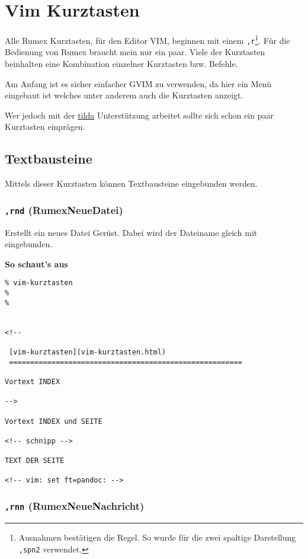 \chapter{Vim Kurztasten}
Alle Rumex Kurztasten, für den Editor VIM, beginnen mit einem
\texttt{,r}\footnote{Ausnahmen bestätigen die Regel. So wurde für die
  zwei spaltige Darstellung\\\texttt{,spn2} verwendet.}. Für die
Bedienung von Rumex braucht mein nur ein paar. Viele der Kurztasten
beinhalten eine Kombination einzelner Kurztasten bzw. Befehle.

Am Anfang ist es sicher einfacher GVIM zu verwenden, da hier ein Menü
eingebaut ist welches unter anderem auch die Kurztasten anzeigt.

Wer jedoch mit der
\href{beschreibung.html\#homepage-änderung-schnell-und-immer-aktuell}{tilda}
Unterstützung arbeitet sollte sich schon ein paar Kurztasten einprägen.

\section{Textbausteine}\label{textbausteine}

Mittels dieser Kurztasten können Textbausteine eingebunden werden.

\subsection{\texttt{,rnd} (RumexNeueDatei)}\label{rnd-rumexneuedatei}

Erstellt ein neues Datei Gerüst. Dabei wird der Dateiname gleich mit
eingebunden.

\textbf{So schaut's aus}

\begin{verbatim}
% vim-kurztasten
%
%


<!--

 [vim-kurztasten](vim-kurztasten.html)
 =======================================================

Vortext INDEX

-->

Vortext INDEX und SEITE

<!-- schnipp -->

TEXT DER SEITE

<!-- vim: set ft=pandoc: -->
\end{verbatim}

\subsection{\texttt{,rnn}
(RumexNeueNachricht)}\label{rnn-rumexneuenachricht}

